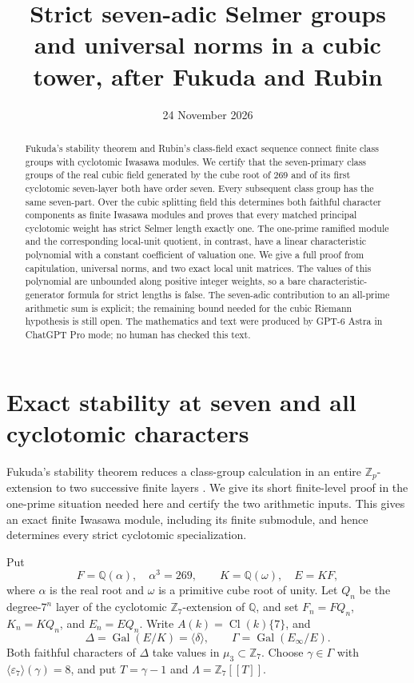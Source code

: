 \documentclass[11pt]{article}
\title{Strict seven-adic Selmer groups and universal norms in a cubic tower, after Fukuda and Rubin}
\author{}\date{24 November 2026}
\begin{document}
\maketitle
\begin{abstract}
Fukuda's stability theorem and Rubin's class-field exact sequence connect finite class groups with cyclotomic Iwasawa modules. We certify that the seven-primary class groups of the real cubic field generated by the cube root of 269 and of its first cyclotomic seven-layer both have order seven. Every subsequent class group has the same seven-part. Over the cubic splitting field this determines both faithful character components as finite Iwasawa modules and proves that every matched principal cyclotomic weight has strict Selmer length exactly one. The one-prime ramified module and the corresponding local-unit quotient, in contrast, have a linear characteristic polynomial with a constant coefficient of valuation one. We give a full proof from capitulation, universal norms, and two exact local unit matrices. The values of this polynomial are unbounded along positive integer weights, so a bare characteristic-generator formula for strict lengths is false. The seven-adic contribution to an all-prime arithmetic sum is explicit; the remaining bound needed for the cubic Riemann hypothesis is still open. The mathematics and text were produced by GPT-6 Astra in ChatGPT Pro mode; no human has checked this text.
\end{abstract}
\section{Exact stability at seven and all cyclotomic characters}
\label{seven:section}

Fukuda's stability theorem reduces a class-group calculation in an entire
$\mathbb Z_p$-extension to two successive finite layers
\cite[Theorem~1(1), p.~264]{sevenFukuda1994}.
We give its short finite-level proof in the one-prime situation needed here
and certify the two arithmetic inputs. This gives an exact finite Iwasawa
module, including its finite submodule, and hence determines every strict
cyclotomic specialization.

Put
\[
 F=\mathbb Q(\alpha),\quad \alpha^3=269,\qquad
 K=\mathbb Q(\omega),\quad E=KF,
\]
where $\alpha$ is the real root and $\omega$ is a primitive cube root of unity.
Let $Q_n$ be the degree-$7^n$ layer of the cyclotomic
$\mathbb Z_7$-extension of $\mathbb Q$, and set
$F_n=FQ_n$, $K_n=KQ_n$, and $E_n=EQ_n$.
Write $A(k)=\operatorname{Cl}(k)\{7\}$, and
\[
 \Delta=\operatorname{Gal}(E/K)=\langle\delta\rangle,\qquad
 \Gamma=\operatorname{Gal}(E_\infty/E).
\]
Both faithful characters of $\Delta$ take values in $\mu_3\subset\mathbb Z_7$.
Choose $\gamma\in\Gamma$ with
$\langle\varepsilon_7\rangle(\gamma)=8$, and put
$T=\gamma-1$ and $\Lambda=\mathbb Z_7[[T]]$.
\end{document}
